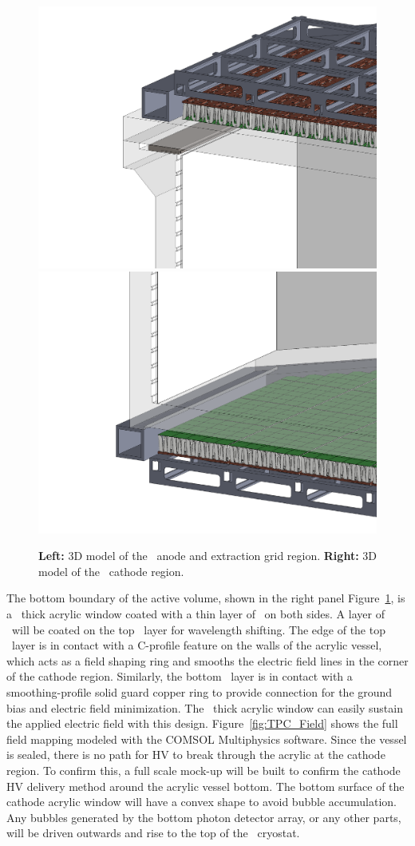 \begin{figure}[t!]
\centering
\includegraphics[width=0.49\columnwidth]{./Figures/TPC-anode.PDF}
\includegraphics[width=0.49\columnwidth]{./Figures/TPC-cathode.PDF}
\caption[\DSks\ \LArTPC\ anode and cathode regions]{{\bf Left:} 3D model of the \LArTPC\ anode and extraction grid region.  {\bf Right:} 3D model of the \LArTPC\ cathode region.}
\label{fig:TPC_anode_cathode}
\end{figure}

The bottom boundary of the active volume, shown in the right panel Figure~\ref{fig:TPC_anode_cathode}, is a \DSkPMMATPCThickness\ thick acrylic window coated with a thin layer of \Clevios\ on both sides. A layer of \TPB\ will be coated on the top \Clevios\ layer for wavelength shifting. The edge of the top \Clevios\ layer is in contact with a C-profile feature on the walls of the acrylic vessel, which acts as a field shaping ring and smooths the electric field lines in the corner of the cathode region. Similarly, the bottom \Clevios\ layer is in contact with a smoothing-profile solid guard copper ring to provide connection for the ground bias and electric field minimization. The  \DSkPMMATPCThickness\ thick acrylic window can easily sustain the applied electric field with this design. Figure~\ref{fig:TPC_Field} shows the full field mapping modeled with the COMSOL Multiphysics software. Since the vessel is sealed, there is no path for HV to break through the acrylic at the cathode region. To confirm this, a full scale mock-up will be built to confirm the cathode HV delivery method around the acrylic vessel bottom.   The bottom surface of the cathode acrylic window will have a convex shape to avoid bubble accumulation.  Any bubbles generated by the bottom photon detector array, or any other parts, will be driven outwards and rise to the top of the \AAr\ cryostat.


